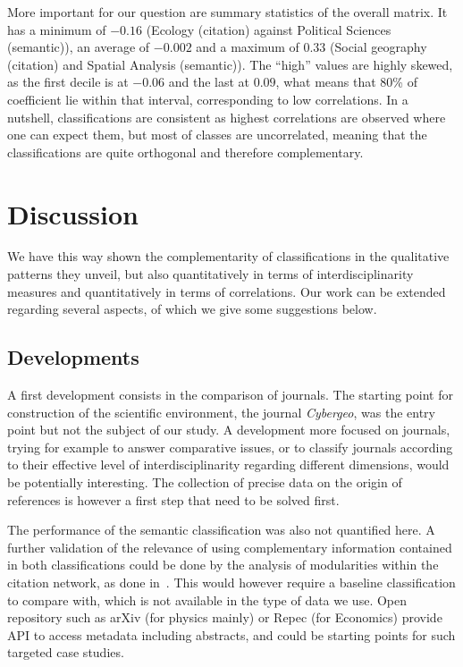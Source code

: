 \documentclass[10pt]{article}
\begin{document}
More important for our question are summary statistics of the overall matrix. It has a minimum of $-0.16$ (Ecology (citation) against Political Sciences (semantic)), an average of $-0.002$ and a maximum of $0.33$ (Social geography (citation) and Spatial Analysis (semantic)). The ``high'' values are highly skewed, as the first decile is at $-0.06$ and the last at $0.09$, what means that 80\% of coefficient lie within that interval, corresponding to low correlations. In a nutshell, classifications are consistent as highest correlations are observed where one can expect them, but most of classes are uncorrelated, meaning that the classifications are quite orthogonal and therefore complementary.



\section*{Discussion}
\label{sec:discussion}

We have this way shown the complementarity of classifications in the qualitative patterns they unveil, but also quantitatively in terms of interdisciplinarity measures and quantitatively in terms of correlations. Our work can be extended regarding several aspects, of which we give some suggestions below.



\subsection*{Developments}


A first development consists in the comparison of journals. The starting point for construction of the scientific environment, the journal \textit{Cybergeo}, was the entry point but not the subject of our study. A development more focused on journals, trying for example to answer comparative issues, or to classify journals according to their effective level of interdisciplinarity regarding different dimensions, would be potentially interesting. The collection of precise data on the origin of references is however a first step that need to be solved first.


The performance of the semantic classification was also not quantified here. A further validation of the relevance of using complementary information contained in both classifications could be done by the analysis of modularities within the citation network, as done in~\cite{bergeaud2017classifying}. This would however require a baseline classification to compare with, which is not available in the type of data we use. Open repository such as arXiv (for physics mainly) or Repec (for Economics) provide API to access metadata including abstracts, and could be starting points for such targeted case studies.
\end{document}
